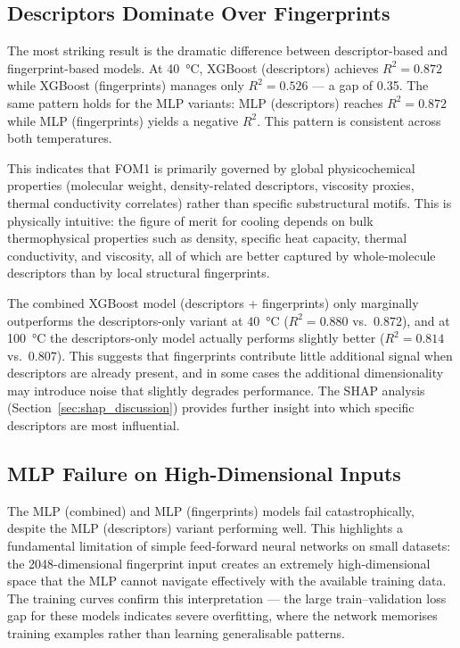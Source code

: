 \documentclass[11pt,a4paper]{article}
\begin{document}
\subsection{Descriptors Dominate Over Fingerprints}

The most striking result is the dramatic difference between descriptor-based and fingerprint-based models. At \SI{40}{\degreeCelsius}, XGBoost (descriptors) achieves $R^2 = 0.872$ while XGBoost (fingerprints) manages only $R^2 = 0.526$ --- a gap of 0.35. The same pattern holds for the MLP variants: MLP (descriptors) reaches $R^2 = 0.872$ while MLP (fingerprints) yields a negative $R^2$. This pattern is consistent across both temperatures.

This indicates that FOM1 is primarily governed by global physicochemical properties (molecular weight, density-related descriptors, viscosity proxies, thermal conductivity correlates) rather than specific substructural motifs. This is physically intuitive: the figure of merit for cooling depends on bulk thermophysical properties such as density, specific heat capacity, thermal conductivity, and viscosity, all of which are better captured by whole-molecule descriptors than by local structural fingerprints.

The combined XGBoost model (descriptors + fingerprints) only marginally outperforms the descriptors-only variant at \SI{40}{\degreeCelsius} ($R^2 = 0.880$ vs.\ $0.872$), and at \SI{100}{\degreeCelsius} the descriptors-only model actually performs slightly better ($R^2 = 0.814$ vs.\ $0.807$). This suggests that fingerprints contribute little additional signal when descriptors are already present, and in some cases the additional dimensionality may introduce noise that slightly degrades performance. The SHAP analysis (Section~\ref{sec:shap_discussion}) provides further insight into which specific descriptors are most influential.

\subsection{MLP Failure on High-Dimensional Inputs}

The MLP (combined) and MLP (fingerprints) models fail catastrophically, despite the MLP (descriptors) variant performing well. This highlights a fundamental limitation of simple feed-forward neural networks on small datasets: the 2048-dimensional fingerprint input creates an extremely high-dimensional space that the MLP cannot navigate effectively with the available training data. The training curves confirm this interpretation --- the large train--validation loss gap for these models indicates severe overfitting, where the network memorises training examples rather than learning generalisable patterns.
\end{document}
